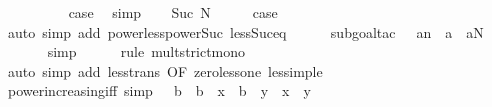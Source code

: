 \begin{isabellebody}
\ \ \isamarkupfalse%
\ {}\isanewline
\ \ \isamarkupfalse%
\ \isamarkupfalse%
\ {\isacharquery}{\kern0pt}case\ \isamarkupfalse%
\ simp\isanewline
{}\isamarkupfalse%
\isanewline
\ \ \isamarkupfalse%
\ {\isacharparenleft}{\kern0pt}Suc\ N{\isacharparenright}{\kern0pt}\isanewline
\ \ \isamarkupfalse%
\ \isamarkupfalse%
\ {\isacharquery}{\kern0pt}case\isanewline
\ \ \ \ \isamarkupfalse%
\ {\isacharparenleft}{\kern0pt}auto\ simp\ add{\isacharcolon}{\kern0pt}\ power{\isacharunderscore}{\kern0pt}less{\isacharunderscore}{\kern0pt}power{\isacharunderscore}{\kern0pt}Suc\ less{\isacharunderscore}{\kern0pt}Suc{\isacharunderscore}{\kern0pt}eq{\isacharparenright}{\kern0pt}\isanewline
\ \ \ \ \isamarkupfalse%
\ {\isacharparenleft}{\kern0pt}subgoal{\isacharunderscore}{\kern0pt}tac\ {\isachardoublequoteopen}{}\ {\isacharasterisk}{\kern0pt}\ a{\isacharcircum}{\kern0pt}n\ {\isacharless}{\kern0pt}\ a\ {\isacharasterisk}{\kern0pt}\ a{\isacharcircum}{\kern0pt}N{\isachardoublequoteclose}{\isacharparenright}{\kern0pt}\isanewline
\ \ \ \ \ \isamarkupfalse%
\ simp\isanewline
\ \ \ \ \isamarkupfalse%
\ {\isacharparenleft}{\kern0pt}rule\ mult{\isacharunderscore}{\kern0pt}strict{\isacharunderscore}{\kern0pt}mono{\isacharparenright}{\kern0pt}\isanewline
\ \ \ \ \isamarkupfalse%
\ {\isacharparenleft}{\kern0pt}auto\ simp\ add{\isacharcolon}{\kern0pt}\ less{\isacharunderscore}{\kern0pt}trans\ {\isacharbrackleft}{\kern0pt}OF\ zero{\isacharunderscore}{\kern0pt}less{\isacharunderscore}{\kern0pt}one{\isacharbrackright}{\kern0pt}\ less{\isacharunderscore}{\kern0pt}imp{\isacharunderscore}{\kern0pt}le{\isacharparenright}{\kern0pt}\isanewline
\ \ \ \ \isamarkupfalse%
\isanewline
{}\isamarkupfalse%
%
\endisatagproof
{\isafoldproof}%
%
\isadelimproof
\isanewline
%
\endisadelimproof
\isanewline
{}\isamarkupfalse%
\ power{\isacharunderscore}{\kern0pt}increasing{\isacharunderscore}{\kern0pt}iff\ {\isacharbrackleft}{\kern0pt}simp{\isacharbrackright}{\kern0pt}{\isacharcolon}{\kern0pt}\ {\isachardoublequoteopen}{}\ {\isacharless}{\kern0pt}\ b\ {\isasymLongrightarrow}\ b\ {\isacharcircum}{\kern0pt}\ x\ {\isasymle}\ b\ {\isacharcircum}{\kern0pt}\ y\ {\isasymlongleftrightarrow}\ x\ {\isasymle}\ y{\isachardoublequoteclose}\isanewline
%
\isadelimproof
\ \ %
\endisadelimproof
%
\isatagproof
{}\isamarkupfalse%

\end{isabellebody}
